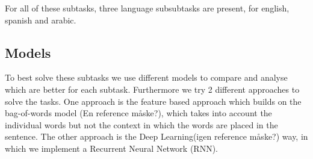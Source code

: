 For all of these subtasks, three language subsubtasks are present, for english, spanish and arabic.\\ 
\subsection{Models}
To best solve these subtasks we use different models to compare and analyse which are better for each subtask. Furthermore we try 2 different approaches to solve the tasks. One approach is the feature based approach which builds on the bag-of-words model (En reference måske?), which takes into account the individual words but not the context in which the words are placed in the sentence. The other approach is the Deep Learning(igen reference måske?) way, in which we implement a Recurrent Neural Network (RNN).